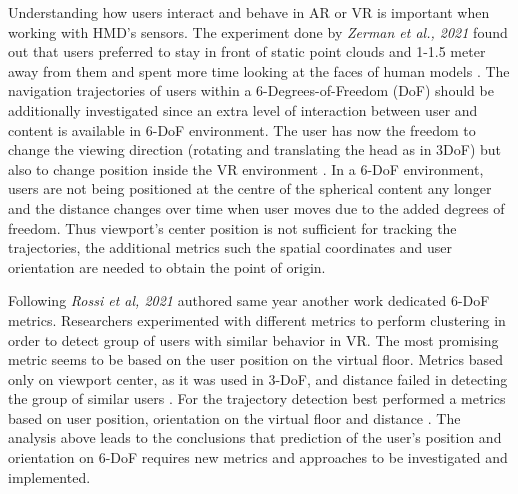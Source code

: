 Understanding how users interact and behave in AR or VR is important when working with HMD's sensors. The experiment done by \textit{Zerman et al., 2021} found out that users preferred to stay in front of static point clouds and 1-1.5 meter away from them and spent more time looking at the faces of human models \cite{user_behav_volumetric}. The navigation trajectories of users within a 6-Degrees-of-Freedom (DoF) should be additionally investigated since an extra level of interaction between user and content is available in 6-DoF environment. The user has now the freedom to change the viewing direction (rotating and translating the head as in 3DoF) but also to change position inside the VR environment \cite{new_challenge}. In a 6-DoF environment, users are not being positioned at the centre of the spherical content any longer and the distance changes over time when user moves due to the added degrees of freedom. Thus viewport’s center position is not sufficient for tracking the trajectories, the additional metrics such the spatial coordinates and user orientation are needed to obtain the point of origin. 

Following \cite{new_challenge} \textit{Rossi et al, 2021} authored same year another work \cite{6-dof_metrics} dedicated 6-DoF metrics. Researchers experimented with different metrics to perform clustering in order to detect group of users with similar behavior in VR. The most promising metric seems to be based on the user position on the virtual floor. Metrics based only on viewport center, as it was used in 3-DoF, and distance failed in detecting the group of similar users \cite{6-dof_metrics}. For the trajectory detection best performed a metrics based on user position, orientation on the virtual floor and distance \cite{6-dof_metrics}. The analysis above leads to the conclusions that prediction of the user's position and orientation on 6-DoF requires new metrics and approaches to be investigated and implemented. 